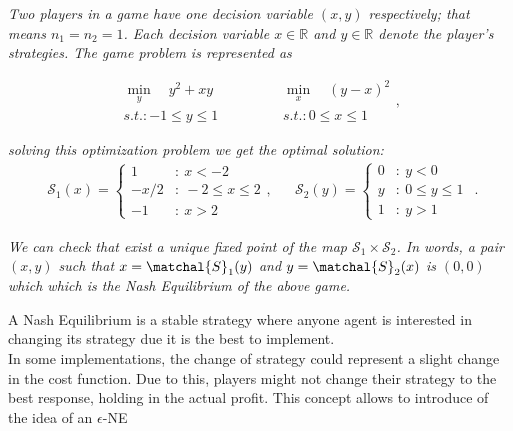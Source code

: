 \begin{example}

\textit{Two players in a game have one decision variable $(x,y)$ respectively; that means $n_1=n_2=1$. Each decision variable $x \in \mathbb{R}$ and $y \in \mathbb{R}$ denote the player's strategies.
The game problem is represented as} 

\begin{equation}
\begin{matrix}
\min_y \quad y^2 + xy & \ & \qquad & \min_x \quad (y-x)^2 \\
s.t.: -1 \le  y \le 1 & \ & \qquad & s.t.: 0 \le  x \le 1
\end{matrix},
\end{equation}

\textit{solving this optimization problem we get the optimal solution:
}
\begin{equation}
\begin{matrix}
\mathcal{S}_1(x) = \left\{ \begin{array}{cl}
1 & : \ x  < -2 \\
-x/2 & : \ -2 \leq x \leq 2 \\
-1 & : \ x > 2
\end{array} \right. ,

& &

\mathcal{S}_2(y) = \left\{ \begin{array}{cl}
0 & : \ y  < 0 \\
y & : \ 0 \leq y \leq 1 \\
1 & : \ y > 1
\end{array} \right.
\end{matrix}.
\end{equation}

\textit{We can check that exist a unique fixed point of the map $\mathcal{S}_1 \times \mathcal{S}_2$. In words, a pair $(x,y)$ such that $x=\matchal{S}_1(y)$ and $y=\matchal{S}_2(x)$ is $(0,0)$ which which is the Nash Equilibrium of the above game.}

\end{example}




A Nash Equilibrium is a stable strategy where anyone agent is interested in changing its strategy due it is the best to implement.\\
In some implementations, the change of strategy could represent a slight change in the cost function. Due to this, players might not change their strategy to the best response, holding in the actual profit. This concept allows to introduce of the idea of an $\epsilon$-NE



